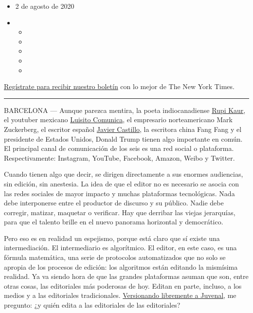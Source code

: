 \begin{itemize}
\item
  2 de agosto de 2020
\item
  \begin{itemize}
  \item
  \item
  \item
  \item
  \item
  \end{itemize}
\end{itemize}

\href{https://www.nytimes3xbfgragh.onion/newsletters/el-times}{Regístrate
para recibir nuestro boletín} con lo mejor de The New York Times.

\begin{center}\rule{0.5\linewidth}{\linethickness}\end{center}

BARCELONA --- Aunque parezca mentira, la poeta indiocanadiense
\href{https://www.instagram.com/rupikaur_/?hl=es}{Rupi Kaur}, el
youtuber mexicano
\href{https://www.youtube.com/user/LuisitoComunicaa}{Luisito Comunica},
el empresario norteamericano Mark Zuckerberg, el escritor español
\href{https://elpais.com/elpais/2020/03/04/icon/1583314253_152494.html}{Javier
Castillo}, la escritora china Fang Fang y el presidente de Estados
Unidos, Donald Trump tienen algo importante en común. El principal canal
de comunicación de los seis es una red social o plataforma.
Respectivamente: Instagram, YouTube, Facebook, Amazon, Weibo y Twitter.

Cuando tienen algo que decir, se dirigen directamente a sus enormes
audiencias, sin edición, sin anestesia. La idea de que el editor no es
necesario se asocia con las redes sociales de mayor impacto y muchas
plataformas tecnológicas. Nada debe interponerse entre el productor de
discurso y su público. Nadie debe corregir, matizar, maquetar o
verificar. Hay que derribar las viejas jerarquías, para que el talento
brille en el nuevo panorama horizontal y democrático.

Pero eso es en realidad un espejismo, porque está claro que sí existe
una intermediación. El intermediario es algorítmico. El editor, en este
caso, es una fórmula matemática, una serie de protocolos automatizados
que no solo se apropia de los procesos de edición: los algoritmos están
editando la mismísima realidad. Ya va siendo hora de que las grandes
plataformas asuman que son, entre otras cosas, las editoriales más
poderosas de hoy. Editan en parte, incluso, a los medios y a las
editoriales tradicionales.
\href{https://www.merriam-webster.com/dictionary/quis\%20custodiet\%20ipsos\%20custodes\%3F}{Versionando
libremente a Juvenal}, me pregunto: ¿y quién edita a las editoriales de
las editoriales?

